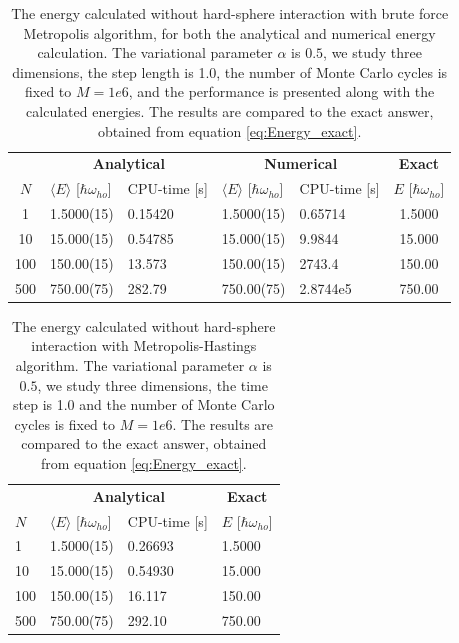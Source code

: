 \documentclass[norsk,a4paper,12pt]{article}
\begin{document}
\begin{table} [H]
	\centering
	\caption{The energy calculated without hard-sphere interaction with brute force Metropolis algorithm, for both the analytical and numerical energy calculation. The variational parameter $\alpha$ is $0.5$, we study three dimensions, the step length is 1.0, the number of Monte Carlo cycles is fixed to $M=1e6$, and the performance is presented along with the calculated energies. The results are compared to the exact answer, obtained from equation \ref{eq:Energy_exact}.\vspace{2mm}}
	\begin{tabularx}{\textwidth}{c|XX|XX|c} \hline\hline
		\label{tab:BFmet}
		& \multicolumn{2}{c}{\textbf{Analytical}} & \multicolumn{2}{c}{\textbf{Numerical}} & \multicolumn{1}{c}{\textbf{Exact}} \\
		$N$ & $\langle E\rangle$ [$\hbar\omega_{ho}$] & CPU-time [s] & $\langle E\rangle$ [$\hbar\omega_{ho}$] & CPU-time [s]& $E$ [$\hbar\omega_{ho}$]\\ \hline
		1 & 1.5000(15) & 0.15420 & 1.5000(15) & 0.65714 & 1.5000\\
		10 & 15.000(15) & 0.54785 & 15.000(15) & 9.9844 & 15.000\\
		100 & 150.00(15) & 13.573 & 150.00(15) & 2743.4 & 150.00\\
		500 & 750.00(75) & 282.79 & 750.00(75) & 2.8744e5 & 750.00\\ \hline
	\end{tabularx}
\end{table}

\begin{table} [H]
	\centering
	\caption{The energy calculated without hard-sphere interaction with Metropolis-Hastings algorithm. The variational parameter $\alpha$ is $0.5$, we study three dimensions, the time step is 1.0 and the number of Monte Carlo cycles is fixed to $M=1e6$. The results are compared to the exact answer, obtained from equation \ref{eq:Energy_exact}.\vspace{2mm}}
	\begin{tabularx}{\textwidth}{X|XX|X} \hline\hline
		\label{tab:ISmet}
		& \multicolumn{2}{c}{\textbf{Analytical}} & \multicolumn{1}{c}{\textbf{Exact}}\\
		$N$ & $\langle E\rangle$ [$\hbar\omega_{ho}$] & CPU-time [s] & $E$ [$\hbar\omega_{ho}$]\\ \hline
		1 & 1.5000(15) & 0.26693  & 1.5000 \\
		10 & 15.000(15) &  0.54930 & 15.000 \\
		100 & 150.00(15) & 16.117 & 150.00 \\
		500 & 750.00(75) & 292.10 & 750.00 \\ \hline
	\end{tabularx}
\end{table}
\end{document}
